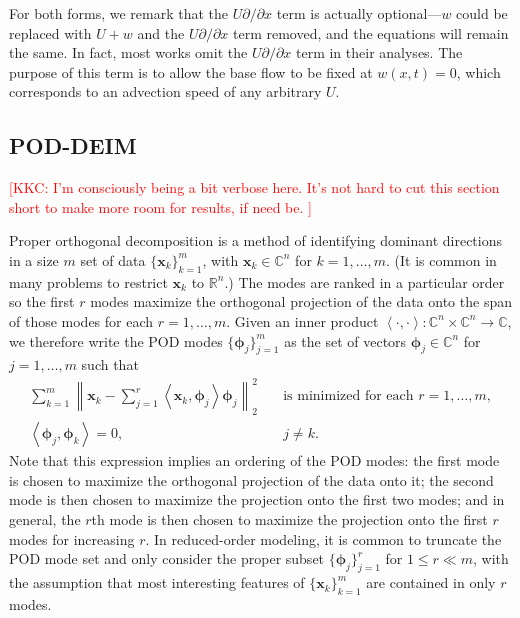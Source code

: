 \documentclass[11pt]{article}
\newcommand*{\Complex}{\mathbb{C}}
\newcommand*{\Reals}{\mathbb{R}}
\newcommand*{\ip}[2]{\left<#1, #2\right>}
\newcommand*{\x}{\mathbf{x}}
\newcommand*{\PHI}{\bm{\phi}}
\newcommand{\kkc}[1]{\textcolor{red}{[KKC: #1]}}
\begin{document}
For both forms, we remark that the $U \partial / \partial x$ term is actually optional---$w$ could be replaced with $U + w$ and the $U \partial / \partial x$ term removed, and the equations will remain the same.
In fact, most works omit the $U \partial / \partial x$ term in their analyses.
The purpose of this term is to allow the base flow to be fixed at $w(x, t) = 0$, which corresponds to an advection speed of any arbitrary $U$.

\subsection{POD-DEIM}

\kkc{%
    I'm consciously being a bit verbose here.
    It's not hard to cut this section short to make more room for results, if need be.%
}

Proper orthogonal decomposition \citep{SirovichQAM87, HolmesTCSDSS} is a method of identifying dominant directions in a size $m$ set of data $\{\x_k\}_{k=1}^m$, with $\x_k \in \Complex^n$ for $k = 1, \ldots, m$.
(It is common in many problems to restrict $\x_k$ to $\Reals^n$.)
The modes are ranked in a particular order so the first $r$ modes maximize the orthogonal projection of the data onto the span of those modes for each $r = 1, \ldots, m$.
Given an inner product $\ip{\cdot}{\cdot} : \Complex^n \times \Complex^n \to \Complex$, we therefore write the POD modes $\{\PHI_j\}_{j=1}^m$ as the set of vectors $\PHI_j \in \Complex^n$ for $j = 1, \ldots, m$ such that
\begin{subequations}
    \begin{align}
        \sum_{k=1}^m \left\|\x_k - \sum_{j=1}^r \ip{\x_k}{\PHI_j} \PHI_j \right\|_2^2 \quad & \text{is minimized for each } r = 1, \ldots, m, \\
        \ip{\PHI_j}{\PHI_k} = 0, \quad & j \ne k.
    \end{align}
\end{subequations}
Note that this expression implies an ordering of the POD modes: the first mode is chosen to maximize the orthogonal projection of the data onto it; the second mode is then chosen to maximize the projection onto the first two modes; and in general, the $r$th mode is then chosen to maximize the projection onto the first $r$ modes for increasing $r$.
In reduced-order modeling, it is common to truncate the POD mode set and only consider the proper subset $\{\PHI_j\}_{j=1}^r$ for $1 \le r \ll m$, with the assumption that most interesting features of $\{\x_k\}_{k=1}^m$ are contained in only $r$ modes.
\end{document}
